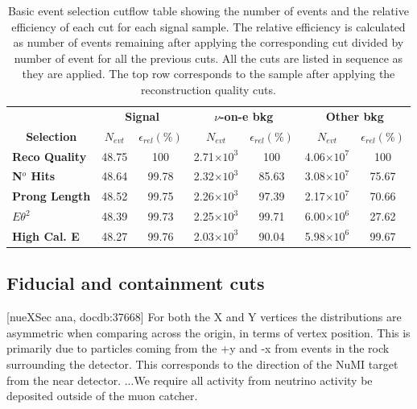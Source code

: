 
\begin{table}[!hb]
\centering
\caption[Event selection cutflow table for the basic event selection]{Basic event selection cutflow table showing the number of events and the relative efficiency of each cut for each signal sample. The relative efficiency is calculated as number of events remaining after applying the corresponding cut divided by number of event for all the previous cuts. All the cuts are listed in sequence as they are applied. The top row corresponds to the sample after applying the reconstruction quality cuts.}
\begin{tabular}{|l|cc|cc|cc|}\hline
\multicolumn{1}{|c|}{} & \multicolumn{2}{c|}{\textbf{Signal}} & \multicolumn{2}{c|}{\textbf{$\nu$-on-e bkg}} & \multicolumn{2}{c|}{\textbf{Other bkg}} \\
\multicolumn{1}{|c|}{\multirow{-2}{*}{\textbf{Selection}}} & \textbf{$N_{evt}$} & \textbf{$\epsilon_{rel}\left(\%\right)$} & \textbf{$N_{evt}$} & \textbf{$\epsilon_{rel}\left(\%\right)$}  & \textbf{$N_{evt}$} & \textbf{$\epsilon_{rel}\left(\%\right)$}\\\hline
\textbf{Reco Quality} & 48.75 & 100 & 2.71$\times 10^3$ & 100 & 4.06$\times 10^7$ & 100\\
\textbf{N$^o$ Hits} & 48.64 & 99.78 & 2.32$\times 10^3$ & 85.63 & 3.08$\times 10^7$ & 75.67\\
\textbf{Prong Length} & 48.52 & 99.75 & 2.26$\times 10^3$ & 97.39 & 2.17$\times 10^7$ & 70.66\\
\textbf{$E\theta^2$} & 48.39 & 99.73 & 2.25$\times 10^3$ & 99.71 & 6.00$\times 10^6$ & 27.62\\
\textbf{High Cal. E} & 48.27 & 99.76 & 2.03$\times 10^3$ & 90.04 & 5.98$\times 10^6$ & 99.67\\\hline
\end{tabular}
\label{tab:CutflowTableBasicSelection}
\end{table}

\subsection{Fiducial and containment cuts}

[nueXSec ana, docdb:37668] For both the X and Y vertices the distributions are asymmetric when comparing across the origin, in terms of vertex position. This is primarily due to particles coming from the +y and -x from events in the rock surrounding the detector. This corresponds to the direction of the NuMI target from the near detector. ...We require all activity from neutrino activity be deposited outside of the muon catcher.

